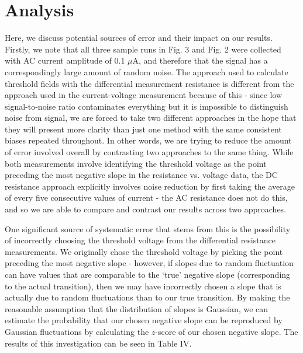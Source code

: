 \documentclass[aps,prl,nofootinbib,twocolumn,superscriptaddress,groupedaddress]{revtex4}  %
\begin{document}
\section{Analysis}
\noindent Here, we discuss potential sources of error and their impact on our results. Firstly, we note that all three sample runs in Fig. 3 and Fig. 2 were collected with AC current amplitude of 0.1 $\mu$A, and therefore that the signal has a correspondingly large amount of random noise. The approach used to calculate threshold fields with the differential measurement resistance is different from the approach used in the current-voltage measurement because of this - since low signal-to-noise ratio contaminates everything but it is impossible to distinguish noise from signal, we are forced to take two different approaches in the hope that they will present more clarity than just one method with the same consistent biases repeated throughout. In other words, we are trying to reduce the amount of error involved overall by contrasting two approaches to the same thing. While both measurements involve identifying the threshold voltage as the point preceding the most negative slope in the resistance vs. voltage data, the DC resistance approach explicitly involves noise reduction by first taking the average of every five consecutive values of current - the AC resistance does not do this, and so we are able to compare and contrast our results across two approaches.

One significant source of systematic error that stems from this is the possibility of incorrectly choosing the threshold voltage from the differential resistance measurements. We originally chose the threshold voltage by picking the point preceding the most negative slope - however, if slopes due to random fluctuation can have values that are comparable to the `true' negative slope (corresponding to the actual transition), then we may have incorrectly chosen a slope that is actually due to random fluctuations than to our true transition. By making the reasonable assumption that the distribution of slopes is Gaussian, we can estimate the probability that our chosen negative slope can be reproduced by Gaussian fluctuations by calculating the $z$-score of our chosen negative slope. The results of this investigation can be seen in Table IV.
\end{document}
